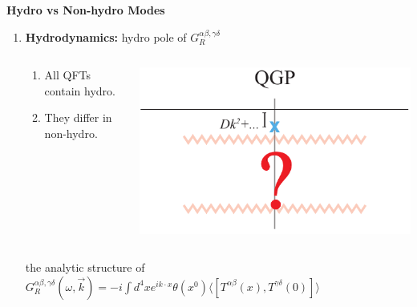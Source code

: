 \documentclass[9pt,a4paper,unknownkeysallowed,xcolor=dvipsnames,aspectratio=43]{beamer}
\begin{document}
%
%
%
\setcounter{page}{12}
\begin{frame}{\bf\huge Hydro vs Non-hydro Modes}
\vspace{4mm}
\begin{enumerate}
\item{\Large{\bf Hydrodynamics:} hydro pole of $G_R^{\alpha\beta, \gamma\delta}$}
\vspace{2mm}
\begin{columns}
\begin{column}{0.55\textwidth}
\vspace{4mm}
\begin{enumerate}
\item{\large All QFTs contain hydro.}
\vspace{4mm}
\item{\color{darkred}\large They differ in non-hydro.}
\end{enumerate}
\vspace{4mm}
\end{column}
\begin{column}{0.3\textwidth}
\begin{center}
\includegraphics[width=\textwidth]{fig/omega_QCD}
\end{center}
\end{column}
\end{columns}
\vspace{4mm}
\begin{center}
the analytic structure of {\small $G_R^{\alpha\beta, \gamma\delta}(\omega, \vec{k}) = -i\int d^4 x e^{ik\cdot x}\theta(x^0)\langle[T^{\alpha\beta}(x),T^{\gamma\delta}(0)] \rangle$}
\\\vspace{1mm}

\end{center}
\end{enumerate}
\end{frame}
\end{document}
